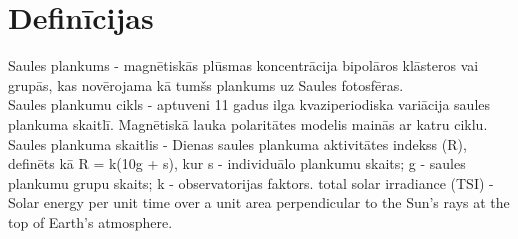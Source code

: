 \section{Definīcijas}
Saules plankums - magnētiskās plūsmas koncentrācija bipolāros klāsteros vai grupās, kas novērojama kā tumšs plankums uz Saules fotosfēras.\\
Saules plankumu cikls - aptuveni 11 gadus ilga kvaziperiodiska variācija saules plankuma skaitlī. Magnētiskā lauka polaritātes modelis mainās ar katru ciklu.\\
Saules plankuma skaitlis - Dienas saules plankuma aktivitātes indekss (R), definēts kā R = k(10g + s), kur
s - individuālo plankumu skaits;
g - saules plankumu grupu skaits;
k - observatorijas faktors.
total solar irradiance (TSI) - Solar energy per unit time over a unit area perpendicular to the Sun’s rays at the top of Earth’s atmosphere.
